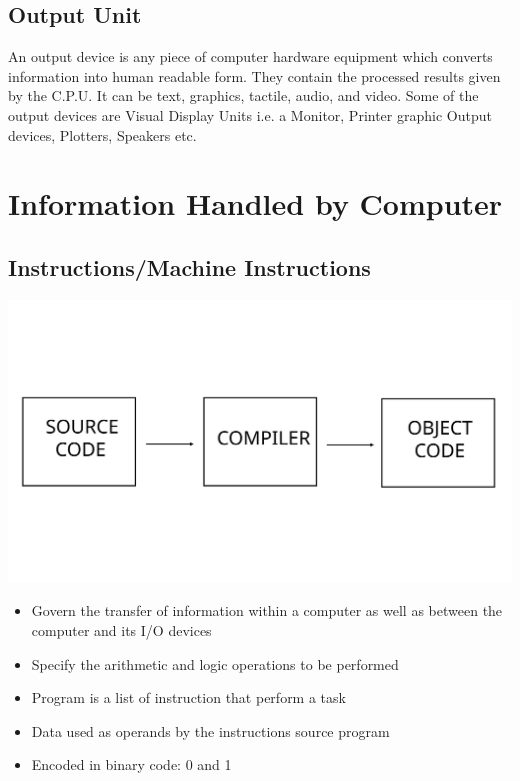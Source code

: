 \documentclass[british]{extreport}
\begin{document}
\subsection{Output Unit}

\noindent An output device is any piece of computer hardware equipment
which converts information into human readable form. They contain
the processed results given by the C.P.U. It can be text, graphics,
tactile, audio, and video. Some of the output devices are Visual Display
Units i.e. a Monitor, Printer graphic Output devices, Plotters, Speakers
etc.

\section{Information Handled by Computer}

\subsection{Instructions/Machine Instructions}
\begin{center}
	\includegraphics[scale=0.25]{Picture/COMPILER_DIAGRAM}
	\par\end{center}
\begin{itemize}
	\item Govern the transfer of information within a computer as well as between
	      the computer and its I/O devices
	\item Specify the arithmetic and logic operations to be performed
	\item Program is a list of instruction that perform a task
	\item Data used as operands by the instructions source program
	\item Encoded in binary code: 0 and 1
\end{itemize}
\end{document}
